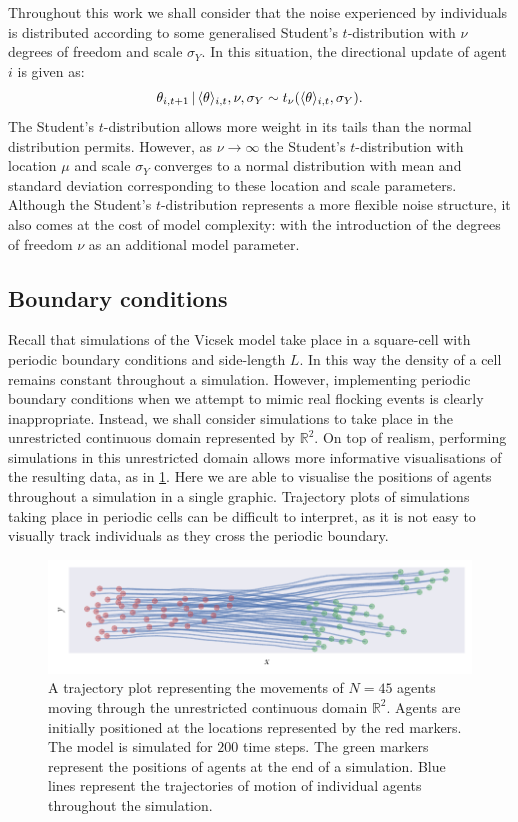 Throughout this work we shall consider that the noise experienced by
individuals is distributed according to some generalised Student's
$t$-distribution with $\nu$ degrees of freedom and scale $\sigma_Y$. In this
situation, the directional update of agent $i$ is given as:
\begin{equation}
  \label{eq:students_update}
  \theta_{i,t+1} \,|\, \langle\theta\rangle_{i,t}, \nu, \sigma_Y \sim
     t_{\nu}(\langle\theta\rangle_{i,t}, \sigma_Y).
\end{equation}
The Student's $t$-distribution allows more weight in its tails than the normal
distribution permits. However, as $\nu\rightarrow\infty$ the Student's
$t$-distribution with location $\mu$ and scale $\sigma_Y$ converges to a normal
distribution with mean and standard deviation corresponding to these location
and scale parameters. Although the Student's $t$-distribution represents a
more flexible noise structure, it also comes at the cost of model complexity:
with the introduction of the degrees of freedom $\nu$ as an additional model
parameter.

\subsection{Boundary conditions}

Recall that simulations of the Vicsek model take place in a square-cell with
periodic boundary conditions and side-length $L$. In this way the density of a
cell remains constant throughout a simulation. However, implementing periodic
boundary conditions when we attempt to mimic real flocking events is clearly
inappropriate. Instead, we shall consider simulations to take place in the
unrestricted continuous domain represented by $\mathbb{R}^2$. On top of
realism, performing simulations in this unrestricted domain allows more
informative visualisations of the resulting data, as in
\cref{fig:example_traj}. Here we are able to visualise the positions of agents
throughout a simulation in a single graphic. Trajectory plots of simulations
taking place in periodic cells can be difficult to interpret, as it is not easy
to visually track individuals as they cross the periodic boundary.

\begin{figure}[tb]
  \includegraphics{example_traj_plot.pdf}
  \caption{A trajectory plot representing the movements of $N=45$ agents
    moving through the unrestricted continuous domain $\mathbb{R}^2$.
    Agents are initially positioned at the locations represented by the red
    markers. The model is simulated for $200$ time steps. The green markers
    represent the positions of agents at the end of a simulation. Blue lines
    represent the trajectories of motion of individual agents throughout the
    simulation.}
    \label{fig:example_traj}
\end{figure}

